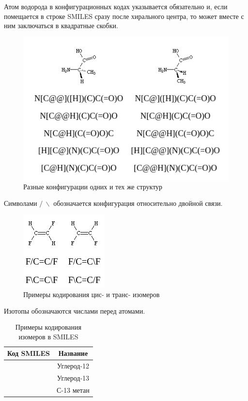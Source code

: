 \documentclass[a4paper,14pt]{extreport}
\begin{document}
Атом водорода в конфигурационных кодах указывается обязательно и, если помещается в строке SMILES сразу после хирального центра, то может вместе с ним заключаться в квадратные скобки.


\begin{figure}[htp]
\centering
\includegraphics[scale=0.80]{images/Screenshot from 2021-12-04 16-57-53.png}
\caption{Разные конфигурации одних и тех же структур}
\label{configs}
\end{figure}

Символами $/\ \backslash$ обозначается конфигурация относительно двойной связи.

\begin{figure}[htp]
\centering
\includegraphics[scale=1.00]{images/Screenshot from 2021-12-04 16-59-41.png}
\caption{Примеры кодирования цис- и транс- изомеров}
\label{isomeric}
\end{figure}




\begin{table}[H]
Изотопы обозначаются числами перед атомами.
\begin{center}
\begin{tabular}{|c|c|}
\hline
	Код SMILES &  Название\\
\hline
	[12C] & Углерод-12\\
\hline
	[13C] & Углерод-13\\
\hline
	[13CH4] & С-13 метан\\
\hline
\end{tabular}
\caption{Примеры кодирования изомеров в SMILES}
\end{center}
\end{table}
\end{document}
